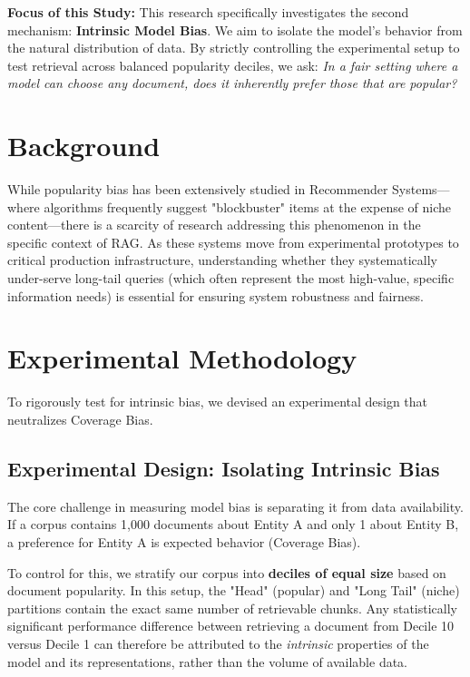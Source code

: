 \documentclass{article}
\begin{document}
\textbf{Focus of this Study:} This research specifically investigates the second mechanism: \textbf{Intrinsic Model Bias}. We aim to isolate the model's behavior from the natural distribution of data. By strictly controlling the experimental setup to test retrieval across balanced popularity deciles, we ask: \textit{In a fair setting where a model can choose any document, does it inherently prefer those that are popular?}

\section{Background}

While popularity bias has been extensively studied in Recommender Systems—where algorithms frequently suggest "blockbuster" items at the expense of niche content—there is a scarcity of research addressing this phenomenon in the specific context of RAG. As these systems move from experimental prototypes to critical production infrastructure, understanding whether they systematically under-serve long-tail queries (which often represent the most high-value, specific information needs) is essential for ensuring system robustness and fairness.

\section{Experimental Methodology}

To rigorously test for intrinsic bias, we devised an experimental design that neutralizes Coverage Bias.

\subsection{Experimental Design: Isolating Intrinsic Bias}
The core challenge in measuring model bias is separating it from data availability. If a corpus contains 1,000 documents about Entity A and only 1 about Entity B, a preference for Entity A is expected behavior (Coverage Bias).

To control for this, we stratify our corpus into \textbf{deciles of equal size} based on document popularity. In this setup, the "Head" (popular) and "Long Tail" (niche) partitions contain the exact same number of retrievable chunks. Any statistically significant performance difference between retrieving a document from Decile 10 versus Decile 1 can therefore be attributed to the \textit{intrinsic} properties of the model and its representations, rather than the volume of available data.
\end{document}
